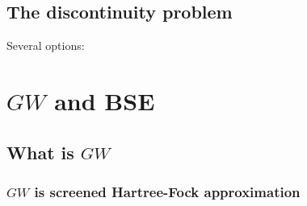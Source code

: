 \documentclass[hyperref, a4paper, 12pt]{report}
\begin{document}
\section{The discontinuity problem}

Several options: \cite{andrade2011prediction,zheng2011improving}

\chapter{$GW$ and BSE}

\section{What is $GW$}

\subsection{$GW$ is screened Hartree-Fock approximation}
\end{document}
